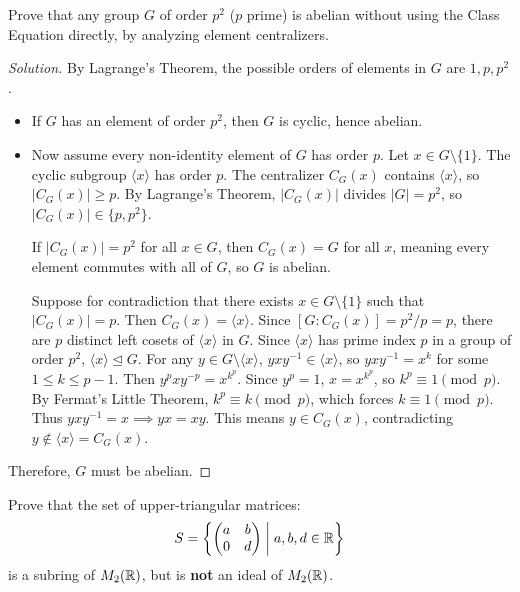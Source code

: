 \begin{problem}
Prove that any group $G$ of order $p^2$ ($p$ prime) is abelian without using the Class Equation directly, by analyzing element centralizers.
\end{problem}

\begin{proof}[Solution]
By Lagrange's Theorem, the possible orders of elements in $G$ are $1, p, p^2$.
\begin{itemize}[leftmargin=1.5em, itemsep=4pt]
    \item If $G$ has an element of order $p^2$, then $G$ is cyclic, hence abelian.
    \item Now assume every non-identity element of $G$ has order $p$.
    Let $x \in G \setminus \{1\}$.
    The cyclic subgroup $\langle x \rangle$ has order $p$.
    The centralizer $C_G(x)$ contains $\langle x \rangle$, so $|C_G(x)| \ge p$.
    By Lagrange's Theorem, $|C_G(x)|$ divides $|G| = p^2$, so $|C_G(x)| \in \{p, p^2\}$.
    
    If $|C_G(x)| = p^2$ for all $x \in G$, then $C_G(x) = G$ for all $x$, meaning every element commutes with all of $G$, so $G$ is abelian.
    
    Suppose for contradiction that there exists $x \in G \setminus \{1\}$ such that $|C_G(x)| = p$.
    Then $C_G(x) = \langle x \rangle$.
    Since $[G : C_G(x)] = p^2/p = p$, there are $p$ distinct left cosets of $\langle x \rangle$ in $G$.
    Since $\langle x \rangle$ has prime index $p$ in a group of order $p^2$, $\langle x \rangle \trianglelefteq G$.
    For any $y \in G \setminus \langle x \rangle$, $y x y^{-1} \in \langle x \rangle$, so $y x y^{-1} = x^k$ for some $1 \le k \le p - 1$.
    Then $y^p x y^{-p} = x^{k^p}$.
    Since $y^p = 1$, $x = x^{k^p}$, so $k^p \equiv 1 \pmod p$.
    By Fermat's Little Theorem, $k^p \equiv k \pmod p$, which forces $k \equiv 1 \pmod p$.
    Thus $y x y^{-1} = x \implies yx = xy$.
    This means $y \in C_G(x)$, contradicting $y \notin \langle x \rangle = C_G(x)$.
\end{itemize}
Therefore, $G$ must be abelian.
\end{proof}

\begin{problem}
Prove that the set of upper-triangular matrices:
\begin{equation}
S = \left\{ \begin{pmatrix} a & b \\ 0 & d \end{pmatrix} \;\middle|\; a, b, d \in \mathbb{R} \right\}
\end{equation}
is a subring of $M_2(\mathbb{R})$, but is \textbf{not} an ideal of $M_2(\mathbb{R})$.
\end{problem}

